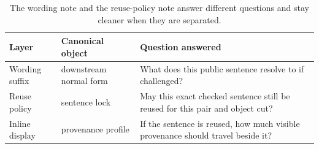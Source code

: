 \documentclass[11pt]{article}
\begin{document}
\begin{table}[t]
\centering
\small
\begin{tabularx}{\linewidth}{@{}l l X@{}}
\toprule
Layer & Canonical object & Question answered \\
\midrule
Wording suffix & downstream normal form & What does this public sentence resolve to if challenged? \\
Reuse policy & sentence lock & May this exact checked sentence still be reused for this pair and object cut? \\
Inline display & provenance profile & If the sentence is reused, how much visible provenance should travel beside it? \\
\bottomrule
\end{tabularx}
\caption{The wording note and the reuse-policy note answer different questions and stay cleaner when they are separated.}
\label{tab:locksplit}
\end{table}
\end{document}

